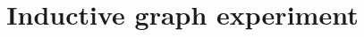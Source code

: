 \documentclass[acmsmall,screen]{acmart}
\begin{document}
\title{Inductive graph experiment}



\end{document}
